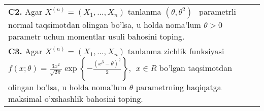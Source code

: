 \documentclass{article}
\begin{document}
\begin{tabular}{m{17cm}}
\\
\textbf{C2.} 
Agar \(X^{(n)} = \left( X_{1},...,X_{n} \right)\) tanlanma \((\theta,\theta^{2})\ \ \) parametrli normal taqsimotdan olingan bo'lsa, u holda noma'lum \(\theta > 0\) parametr uchun momentlar usuli bahosini toping.
\\
\textbf{C3.} 
Agar \(X^{(n)} = \left( X_{1},...,X_{n} \right)\) tanlanma zichlik funksiyasi \(f(x;\theta) = \frac{3x^{2}}{\sqrt{2\pi}}\exp\left\{ - \frac{\left( x^{3} - \theta \right)^{2}}{2} \right\},\ \ x \in R\) bo'lgan taqsimotdan olingan bo'lsa, u holda noma'lum \(\theta\) parametrning haqiqatga maksimal o'xshashlik bahosini toping.
\\

\end{tabular}
\vspace{1cm}
\end{document}

